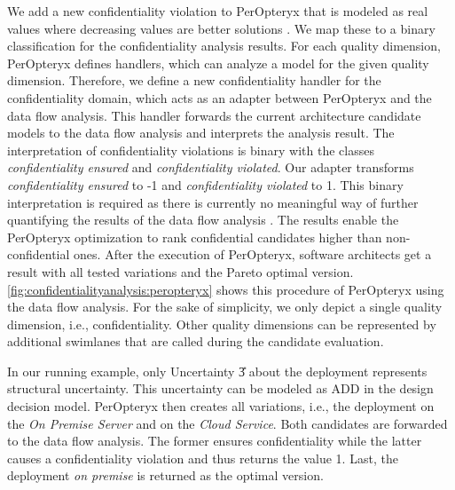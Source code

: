 We add a new confidentiality violation to PerOpteryx that is modeled as real values where decreasing values are better solutions \cite{liu_design_2021}.
We map these to a binary classification for the confidentiality analysis results.
For each quality dimension, PerOpteryx defines handlers, which can analyze a model for the given quality dimension. 
Therefore, we define a new confidentiality handler for the confidentiality domain, which acts as an adapter between PerOpteryx and the data flow analysis.
This handler forwards the current architecture candidate models to the data flow analysis and interprets the analysis result.
The interpretation of confidentiality violations is binary with the classes \emph{confidentiality ensured} and \emph{confidentiality violated}. 
Our adapter transforms \emph{confidentiality ensured} to -1 and \emph{confidentiality violated} to 1.
This binary interpretation is required as there is currently no meaningful way of further quantifying the results of the data flow analysis \cite{walter_architectural_2022}.
The results enable the PerOpteryx optimization to rank confidential candidates higher than non-confidential ones.
After the execution of PerOpteryx, software architects get a result with all tested variations and the Pareto optimal version.
\autoref{fig:confidentialityanalysis:peropteryx} shows this procedure of PerOpteryx \cite{koziolek_peropteryx_2011} using the data flow analysis.
For the sake of simplicity, we only depict a single quality dimension, i.e., confidentiality.
Other quality dimensions can be represented by additional swimlanes that are called during the candidate evaluation.

In our running example, only Uncertainty \U{3} about the deployment represents structural uncertainty.
This uncertainty can be modeled as \ac{ADD} in the design decision model.
PerOpteryx then creates all variations, i.e., the deployment on the \emph{On Premise Server} and on the \emph{Cloud Service}.
Both candidates are forwarded to the data flow analysis.
The former ensures confidentiality while the latter causes a confidentiality violation and thus returns the value 1.
Last, the deployment \emph{on premise} is returned as the optimal version.

